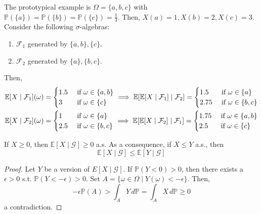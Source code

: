 	\begin{example}
	  \label{ex:conditional-expectation-on-a-three-point-space}
		The prototypical example is $\Omega = \{a, b, c\}$ with $\mathbb{P}(\{a\}) = \mathbb{P}(\{b\}) = \mathbb{P}(\{c\}) = \frac{1}{3}$. Then, $X(a) = 1, X(b) = 2, X(c) = 3$. Consider the following $\sigma$-algebras: 
		\begin{enumerate}
			\item $\mathcal{F}_1$ generated by $\{a, b\}, \{c\}$. 
			\item $\mathcal{F}_2$ generated by $\{a\}, \{b, c\}$. 
		\end{enumerate}
		Then, 
		\begin{align}
			\operatorname{\mathbb{E}}[X \mid \mathcal{F}_1](\omega) & = \begin{cases} 
				1.5 & \text{ if } \omega \in \{a, b\} \\ 
				3 & \text{ if } \omega \in \{c\} 
			\end{cases} \implies \operatorname{\mathbb{E}}[ \operatorname{\mathbb{E}}[X \mid \mathcal{F}_1] \mid \mathcal{F}_2] = 
			\begin{cases} 
				1.5 & \text{ if } \omega \in \{a\} \\ 
				2.75 & \text{ if } \omega \in \{b, c\} 
			\end{cases} \\ 
			\operatorname{\mathbb{E}}[X \mid \mathcal{F}_2](\omega) & = \begin{cases} 
				1 & \text{ if } \omega \in \{a\} \\ 
				2.5 & \text{ if } \omega \in \{b, c\} 
			\end{cases} \implies \operatorname{\mathbb{E}}[ \operatorname{\mathbb{E}}[X \mid \mathcal{F}_2] \mid \mathcal{F}_1] = 
			\begin{cases} 
				1.75 & \text{ if } \omega \in \{a, b\} \\ 
				2.5 & \text{ if } \omega \in \{c\} 
			\end{cases}
		\end{align}
	\end{example}


	\begin{theorem}[Positivity]
	  \label{thm:positivity}
		If $X \geq 0$, then $\mathbb{E}[X \mid \mathcal{G}] \geq 0$ a.s. As a consequence, if $X \leq Y$ a.s., then 
		\begin{equation}
			\mathbb{E}[X \mid \mathcal{G}] \leq \mathbb{E}[Y \mid \mathcal{G}]
		\end{equation}
	\end{theorem}
	\begin{proof}
		Let $Y$ be a version of $E[X \mid \mathcal{G}]$. If $\mathbb{P}(Y < 0) > 0$, then there exists a $\epsilon > 0$ s.t. $\mathbb{P}(Y < -\epsilon) > 0$. Set $A = \{\omega \in \Omega \mid Y(\omega) < -\epsilon\}$. Then, 
		\begin{equation}
			-\epsilon \mathbb{P}(A) > \int_A Y\,d\mathbb{P} = \int_A X \,d\mathbb{P} \geq 0
		\end{equation}
		a contradiction. 
	\end{proof}

